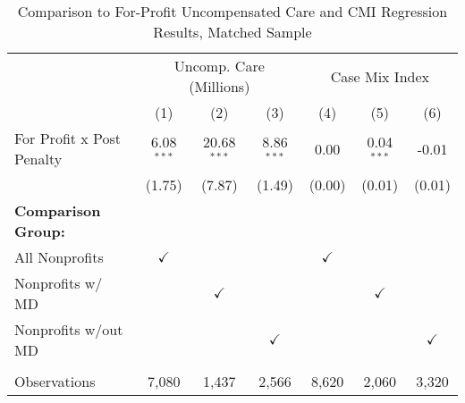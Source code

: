 \begin{table}[htbp]
   \caption{\label{tab:forprofit_uncomp_CMI_matchsample} Comparison to For-Profit Uncompensated Care and CMI Regression Results, Matched Sample}
   \bigskip
   \centering
   \begin{tabular}{lcccccc}
      \toprule
       & \multicolumn{3}{c}{Uncomp. Care (Millions)} & \multicolumn{3}{c}{Case Mix Index}\\
                                  & (1)           & (2)           & (3)           & (4)           & (5)           & (6)\\  
      \midrule 
      For Profit x Post Penalty   & 6.08$^{***}$  & 20.68$^{***}$ & 8.86$^{***}$  & 0.00          & 0.04$^{***}$  & -0.01\\   
                                  & (1.75)        & (7.87)        & (1.49)        & (0.00)        & (0.01)        & (0.01)\\   
      \textbf{Comparison Group:}  &               &               &               &               &               & \\  
      All Nonprofits              & $\checkmark$  &               &               & $\checkmark$  &               & \\  
      Nonprofits w/ MD            &               & $\checkmark$  &               &               & $\checkmark$  & \\  
      Nonprofits w/out MD         &               &               & $\checkmark$  &               &               & $\checkmark$\\   
       \\
      Observations                & 7,080         & 1,437         & 2,566         & 8,620         & 2,060         & 3,320\\  
      \bottomrule
   \end{tabular}
\end{table}